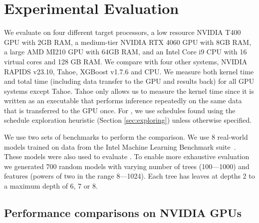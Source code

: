 \section{Experimental Evaluation}
\label{sec:results}

We evaluate \Treebeard{} on four different target processors, a low resource NVIDIA T400 GPU with 2GB RAM, a medium-tier NVIDIA RTX 4060 GPU with 8GB RAM, a large AMD MI210 GPU with 64GB RAM, and an 
Intel Core i9 CPU  with 16 virtual cores and 128 GB RAM. We compare \Treebeard{} with 
four other systems, NVIDIA RAPIDS\cite{RAPIDS} v23.10, Tahoe\cite{Tahoe}, XGBoost\cite{XGBoost}
v1.7.6 and \TreebeardOLD{}\cite{Treebeard} CPU. 
We measure both kernel time and total time (including data transfer to the GPU and results back) 
for all GPU systems except Tahoe. Tahoe only allows us to measure the kernel time since it is written
as an executable that performs inference repeatedly on the same data that is transferred to the GPU once.
For \Treebeard{}, we use schedules found using the schedule exploration
heuristic (Section \ref{sec:exploring}) unless otherwise specified.

We use two sets of benchmarks to perform the comparison.
We use 8 real-world models trained on data from the Intel Machine 
Learning Benchmark suite~\cite{MLBenchmarks}. These models were also
used to evaluate \TreebeardOLD{}\cite{Treebeard}.
To enable more exhaustive evaluation we generated 700 random models with
varying number of trees (100---1000) and features (powers of two in the range 8---1024). 
Each tree has leaves at depths 2 to a maximum depth of 6, 7 or 8.

\subsection{Performance comparisons on NVIDIA GPUs}

